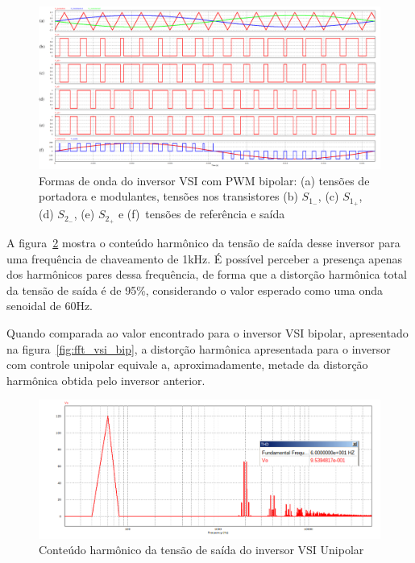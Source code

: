 \documentclass[
	12pt,				%
	openany,
	onseside,
	a4paper,			%
	english,			%
	french,				%
	spanish,			%
	brazil,				%
	]{abntex2}
\begin{document}
\begin{figure}[htbp]%
	\captionsetup{justification=centering}
	\centering%
		\includegraphics[width= \linewidth]{vsi_uni_func}
		\caption{Formas de onda do inversor VSI com PWM bipolar: (a) tensões de portadora e modulantes, tensões nos transistores (b) $S_{1_-}$, (c) $S_{1_+}$, (d) $S_{2_-}$, (e) $S_{2_+}$ e (f)~tensões de referência e saída}
		\label{fig:vsi_uni_func_graph}
\end{figure}

A figura~\ref{fig:fft_vsi_unip} mostra o conteúdo harmônico da tensão de saída desse inversor para uma frequência de chaveamento de 1kHz. É possível perceber a presença apenas dos harmônicos pares dessa frequência, de forma que a distorção harmônica total da tensão de saída é de 95\%, considerando o valor esperado como uma onda senoidal de 60Hz. 

Quando comparada ao valor encontrado para o inversor VSI bipolar, apresentado na figura~\ref{fig:fft_vsi_bip}, a distorção harmônica apresentada para o inversor com controle unipolar equivale a, aproximadamente, metade da distorção harmônica obtida pelo inversor anterior. 

\begin{figure}[H]%
	\centering%
		\includegraphics[width= \linewidth]{fft_vsi_uni}
		\caption{Conteúdo harmônico da tensão de saída do inversor VSI Unipolar}
		\label{fig:fft_vsi_unip}
\end{figure}
\end{document}
